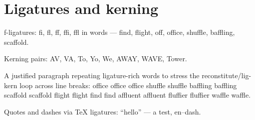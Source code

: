 \documentclass[12pt]{article}
\begin{document}
\section*{Ligatures and kerning}

f-ligatures: fi, fl, ff, ffi, ffl in words --- find, flight, off,
office, shuffle, baffling, scaffold.

Kerning pairs: AV, VA, To, Yo, We, AWAY, WAVE, Tower.

A justified paragraph repeating ligature-rich words to stress the
reconstitute/lig-kern loop across line breaks: office office office
shuffle shuffle baffling baffling scaffold scaffold flight flight find
find affluent affluent fluffier fluffier waffle waffle.

Quotes and dashes via TeX ligatures: ``hello'' --- a test, en--dash.
\end{document}
